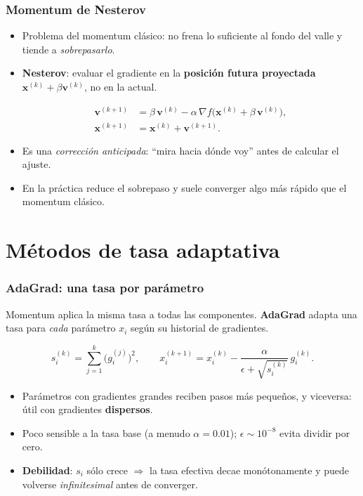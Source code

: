 \documentclass[aspectratio=169, 10pt]{beamer}
\newcommand{\xv}{\bm{x}}
\newcommand{\vv}{\bm{v}}
\newcommand{\grad}{\nabla}
\newcommand{\formula}[1]{%
	\begin{tcolorbox}[colback=UCMBlue!8, colframe=UCMBlue, arc=4pt,
		boxsep=2pt, left=6pt, right=6pt, top=3pt, bottom=3pt]
		#1
	\end{tcolorbox}
}
\begin{document}
\begin{frame}
\frametitle{Momentum de Nesterov}
\begin{itemize}
	\item Problema del momentum cl\'asico: no frena lo suficiente al fondo del valle y tiende a \emph{sobrepasarlo}.
	\pause
	\item \textbf{Nesterov}: evaluar el gradiente en la \textbf{posici\'on futura proyectada} $\xv^{(k)}+\beta\vv^{(k)}$, no en la actual.
	\formula{\[
	\begin{aligned}
	\vv^{(k+1)} &= \beta\,\vv^{(k)} - \alpha\,\grad f\big(\xv^{(k)} + \beta\,\vv^{(k)}\big),\\
	\xv^{(k+1)} &= \xv^{(k)} + \vv^{(k+1)}.
	\end{aligned}
	\]}
	\pause
	\item Es una \emph{correcci\'on anticipada}: ``mira hacia d\'onde voy'' antes de calcular el ajuste.
	\item En la pr\'actica reduce el sobrepaso y suele converger algo m\'as r\'apido que el momentum cl\'asico.
\end{itemize}
\end{frame}

\section{M\'etodos de tasa adaptativa}

\begin{frame}
\frametitle{AdaGrad: una tasa por par\'ametro}
Momentum aplica la misma tasa a todas las componentes. \textbf{AdaGrad} adapta una tasa para \emph{cada} par\'ametro $x_i$ seg\'un su historial de gradientes.
\formula{\[
s_i^{(k)} = \sum_{j=1}^{k}\big(g_i^{(j)}\big)^2,
\qquad
x_i^{(k+1)} = x_i^{(k)} - \frac{\alpha}{\epsilon + \sqrt{s_i^{(k)}}}\,g_i^{(k)}.
\]}
\begin{itemize}
	\item Par\'ametros con gradientes grandes reciben pasos m\'as peque\~nos, y viceversa: \'util con gradientes \textbf{dispersos}.
	\item Poco sensible a la tasa base (a menudo $\alpha=0.01$); $\epsilon\sim 10^{-8}$ evita dividir por cero.
	\pause
	\item \textbf{Debilidad}: $s_i$ s\'olo crece $\Rightarrow$ la tasa efectiva decae mon\'otonamente y puede volverse \emph{infinitesimal} antes de converger.
\end{itemize}
\end{frame}
\end{document}
